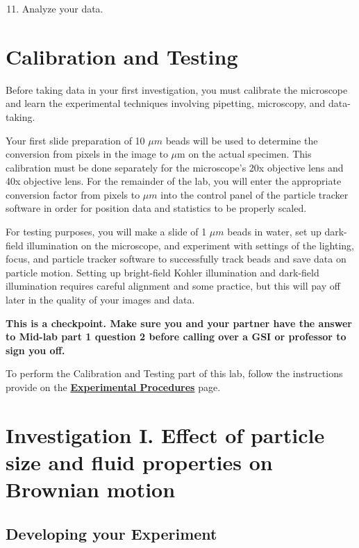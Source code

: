 \documentclass{../lab}
\begin{document}
\begin{enumerate}
    \setcounter{enumi}{10}
    \item Analyze your data.
\end{enumerate}

\section{Calibration and Testing}
\label{sec:CalibrationAndTesting}

Before taking data in your first investigation, you must calibrate the microscope and learn the experimental techniques involving pipetting, microscopy, and data-taking.

Your first slide preparation of 10 $\mu m$ beads will be used to determine the conversion from pixels in the image to $\mu$m on the actual specimen. This calibration must be done separately for the microscope's 20x objective lens and 40x objective lens. For the remainder of the lab, you will enter the appropriate conversion factor from pixels to $\mu m$ into the control panel of the particle tracker software in order for position data and statistics to be properly scaled.

For testing purposes, you will make a slide of 1 $\mu m$ beads in water, set up dark-field illumination on the microscope, and experiment with settings of the lighting, focus, and particle tracker software to successfully track beads and save data on particle motion. Setting up bright-field Kohler illumination and dark-field illumination requires careful alignment and some practice, but this will pay off later in the quality of your images and data.

\textbf{This is a checkpoint. Make sure you and your partner have the answer to Mid-lab part 1 question 2 before calling over a GSI or professor to sign you off.}

To perform the Calibration and Testing part of this lab, follow the instructions provide on the \href{http://experimentationlab.berkeley.edu/node/84}{\textbf{Experimental Procedures}} page.

\section{Investigation I. Effect of particle size and fluid properties on Brownian motion}
\label{sec:InvestigationI}

\subsection{Developing your Experiment}
\end{document}
